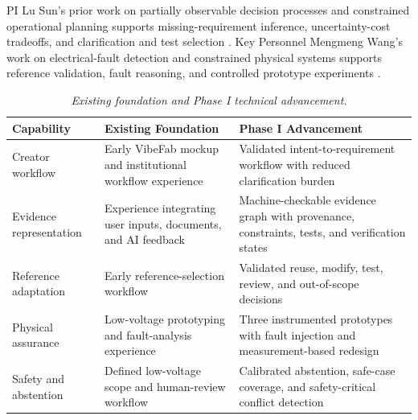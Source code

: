 \documentclass[11pt,letterpaper]{article}
\begin{document}
PI Lu Sun's prior work on partially observable decision processes and constrained operational planning supports missing-requirement inference, uncertainty-cost tradeoffs, and clarification and test selection \cite{chang2023pomdp,chang2021uniform}. Key Personnel Mengmeng Wang's work on electrical-fault detection and constrained physical systems supports reference validation, fault reasoning, and controlled prototype experiments \cite{chen2022incipient,hu2026lipmotions}. 

\vspace{-3pt}
\begin{table}[H]
\centering
\small
\renewcommand{\arraystretch}{1.15}
\begin{tabularx}{\textwidth}{
P{0.21\textwidth}
P{0.3\textwidth}
Y}
\toprule
{\textbf{Capability}} &
{\textbf{Existing Foundation}} &
{\textbf{Phase I Advancement}} \\
\midrule

Creator workflow &
Early VibeFab mockup and institutional workflow experience &
Validated intent-to-requirement workflow with reduced clarification burden \\

 Evidence representation &
Experience integrating user inputs, documents, and AI feedback &
Machine-checkable evidence graph with provenance, constraints, tests, and verification states \\

Reference adaptation &
Early reference-selection workflow &
Validated reuse, modify, test, review, and out-of-scope decisions \\

 Physical assurance &
Low-voltage prototyping and fault-analysis experience &
Three instrumented prototypes with fault injection and measurement-based redesign \\

Safety and abstention &
Defined low-voltage scope and human-review workflow &
Calibrated abstention, safe-case coverage, and safety-critical conflict detection \\

\bottomrule
\end{tabularx}
\caption{\textit{Existing foundation and Phase I technical advancement.}}
\label{tab:current_phase1}
\end{table}
\vspace{-10pt}
\end{document}
